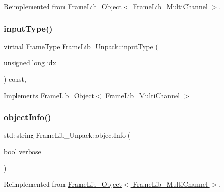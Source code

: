 Reimplemented from \hyperlink{class_frame_lib___object_a49abea5f18125c425b1eae8710735891}{Frame\+Lib\+\_\+\+Object$<$ Frame\+Lib\+\_\+\+Multi\+Channel $>$}.

\mbox{\label{class_frame_lib___unpack_ac5053983d308b6c715ca2a59d4115ec8}} 
\subsubsection{\texorpdfstring{input\+Type()}{inputType()}}
{\footnotesize\ttfamily virtual \hyperlink{_frame_lib___types_8h_ad495a9f61af7fff07d7e97979d1ab854}{Frame\+Type} Frame\+Lib\+\_\+\+Unpack\+::input\+Type (\begin{DoxyParamCaption}\item[{unsigned long}]{idx }\end{DoxyParamCaption}) const\hspace{0.3cm}{\ttfamily [inline]}, {\ttfamily [virtual]}}



Implements \hyperlink{class_frame_lib___object_ab1ab1ae8180bb8b7e881aac6a4e1066c}{Frame\+Lib\+\_\+\+Object$<$ Frame\+Lib\+\_\+\+Multi\+Channel $>$}.

\mbox{\label{class_frame_lib___unpack_ab298a6feb7c051f3563a01caacd99c02}} 
\subsubsection{\texorpdfstring{object\+Info()}{objectInfo()}}
{\footnotesize\ttfamily std\+::string Frame\+Lib\+\_\+\+Unpack\+::object\+Info (\begin{DoxyParamCaption}\item[{bool}]{verbose }\end{DoxyParamCaption})\hspace{0.3cm}{\ttfamily [virtual]}}



Reimplemented from \hyperlink{class_frame_lib___object_a10d673de9a3c59ace6a22ba1cff313c8}{Frame\+Lib\+\_\+\+Object$<$ Frame\+Lib\+\_\+\+Multi\+Channel $>$}.

